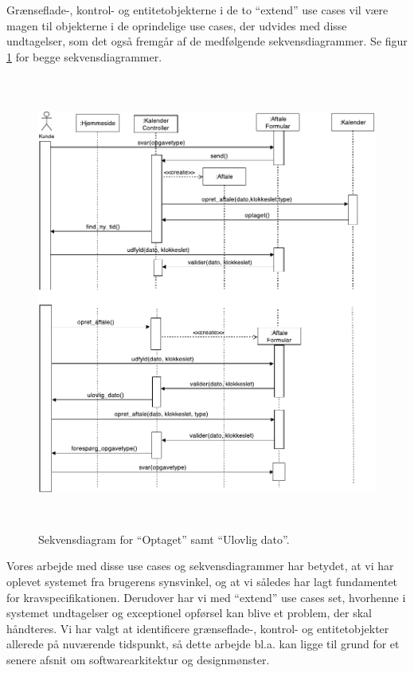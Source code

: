 \documentclass[12pt]{article}   %
\begin{document}
Grænseflade-, kontrol- og entitetobjekterne i de to ``extend'' use cases vil
være magen til objekterne i de oprindelige use cases, der udvides med disse
undtagelser, som det også fremgår af de medfølgende sekvensdiagrammer. Se figur
\ref{fig:extseq} for begge sekvensdiagrammer. \\

\begin{figure}[!ht]
\begin{center}
\includegraphics[width=13cm, height=15cm]{ext.pdf}
\caption{Sekvensdiagram for ``Optaget'' samt  ``Ulovlig dato''.}
\label{fig:extseq}
\end{center}
\end{figure}

Vores arbejde med disse use cases og sekvensdiagrammer har betydet, at vi har oplevet systemet fra brugerens synsvinkel, og at vi således har lagt fundamentet for kravspecifikationen. Derudover har vi med ``extend'' use cases set, hvorhenne i systemet undtagelser og exceptionel opførsel kan blive et problem, der skal håndteres. Vi har valgt at identificere grænseflade-, kontrol- og entitetobjekter allerede på nuværende tidspunkt, så dette arbejde bl.a. kan ligge til grund for et senere afsnit om softwarearkitektur og designmønster. 
\end{document}
